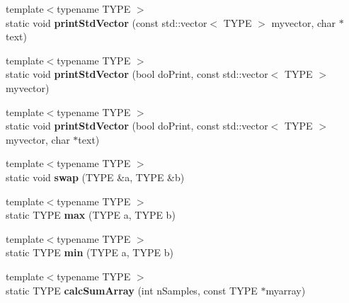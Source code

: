 \begin{DoxyCompactItemize}
\item 
\hypertarget{class_k_w_util_a8d69c11c8b97c2bc5aee5449ece9b11d}{{\footnotesize template$<$typename T\-Y\-P\-E $>$ }\\static void {\bfseries print\-Std\-Vector} (const std\-::vector$<$ T\-Y\-P\-E $>$ myvector, char $\ast$text)}\label{class_k_w_util_a8d69c11c8b97c2bc5aee5449ece9b11d}

\item 
\hypertarget{class_k_w_util_a684d6abf0326e8d495f709c2b1d82ea2}{{\footnotesize template$<$typename T\-Y\-P\-E $>$ }\\static void {\bfseries print\-Std\-Vector} (bool do\-Print, const std\-::vector$<$ T\-Y\-P\-E $>$ myvector)}\label{class_k_w_util_a684d6abf0326e8d495f709c2b1d82ea2}

\item 
\hypertarget{class_k_w_util_ac17252f672282e2f60e76d594ed2d8f7}{{\footnotesize template$<$typename T\-Y\-P\-E $>$ }\\static void {\bfseries print\-Std\-Vector} (bool do\-Print, const std\-::vector$<$ T\-Y\-P\-E $>$ myvector, char $\ast$text)}\label{class_k_w_util_ac17252f672282e2f60e76d594ed2d8f7}

\item 
\hypertarget{class_k_w_util_a6ed5d213169247c4b3fe3ed2fb96dd88}{{\footnotesize template$<$typename T\-Y\-P\-E $>$ }\\static void {\bfseries swap} (T\-Y\-P\-E \&a, T\-Y\-P\-E \&b)}\label{class_k_w_util_a6ed5d213169247c4b3fe3ed2fb96dd88}

\item 
\hypertarget{class_k_w_util_a707d699ad01c87ba21e06fe28de85712}{{\footnotesize template$<$typename T\-Y\-P\-E $>$ }\\static T\-Y\-P\-E {\bfseries max} (T\-Y\-P\-E a, T\-Y\-P\-E b)}\label{class_k_w_util_a707d699ad01c87ba21e06fe28de85712}

\item 
\hypertarget{class_k_w_util_af1b3640361810ba75435a850d73a2413}{{\footnotesize template$<$typename T\-Y\-P\-E $>$ }\\static T\-Y\-P\-E {\bfseries min} (T\-Y\-P\-E a, T\-Y\-P\-E b)}\label{class_k_w_util_af1b3640361810ba75435a850d73a2413}

\item 
\hypertarget{class_k_w_util_abe27306f912197863466e7c68d3c66fb}{{\footnotesize template$<$typename T\-Y\-P\-E $>$ }\\static T\-Y\-P\-E {\bfseries calc\-Sum\-Array} (int n\-Samples, const T\-Y\-P\-E $\ast$myarray)}\label{class_k_w_util_abe27306f912197863466e7c68d3c66fb}


\end{DoxyCompactItemize}
